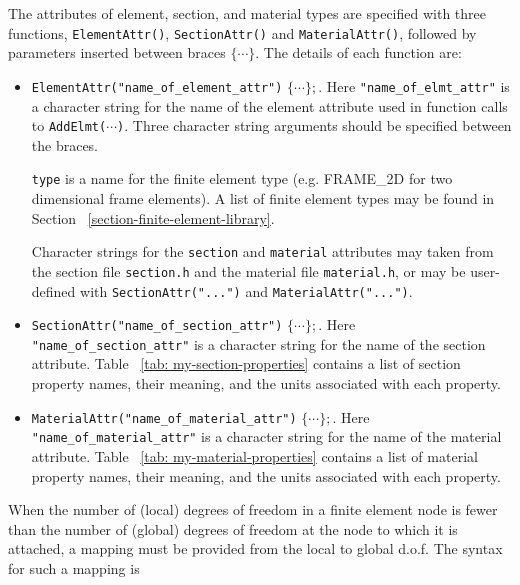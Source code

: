 \vspace{0.15 in}
\noindent\hspace{0.5 in}
The attributes of element, section, and material types are
specified with three functions,
{\tt ElementAttr()}, {\tt SectionAttr()} and {\tt MaterialAttr()},
followed by parameters inserted between braces ${\lbrace \cdots \rbrace}$.
The details of each function are:

\begin{itemize}
\item{}
{\tt ElementAttr("name\_of\_element\_attr")} ${\lbrace \cdots \rbrace};$.
Here {\tt "name\_of\_elmt\_attr"} is a character string for the
name of the element attribute used in function calls to {\tt AddElmt($\cdots$)}.
Three character string arguments should be specified between the braces.

\vspace{0.10 in}
{\tt type} is a name for the finite element type (e.g. FRAME\_2D for
two dimensional frame elements). A list of finite element types
may be found in Section ~\ref{section-finite-element-library}.

\vspace{0.10 in}
Character strings for the {\tt section} and {\tt material} attributes
may taken from the section file {\tt section.h}
and the material file {\tt material.h}, or may be user-defined
with {\tt SectionAttr("...")} and {\tt MaterialAttr("...")}.

\item{}
{\tt SectionAttr("name\_of\_section\_attr")} ${\lbrace \cdots \rbrace};$.
Here {\tt "name\_of\_section\_attr"} is a character
string for the name of the section attribute.
Table ~\ref{tab: my-section-properties} contains a list of
section property names, their meaning, and the units associated with each property.

\item{}
{\tt MaterialAttr("name\_of\_material\_attr")} ${\lbrace \cdots \rbrace};$.
Here {\tt "name\_of\_material\_attr"} is a character
string for the name of the material attribute.
Table ~\ref{tab: my-material-properties} contains a list of
material property names, their meaning,
and the units associated with each property.
\end{itemize}

\vspace{0.15 in}\noindent
When the number of (local) degrees of freedom in a finite element node is fewer
than the number of (global) degrees of freedom at the node to which it is attached,
a mapping must be provided from the local to global d.o.f.
The syntax for such a mapping is

